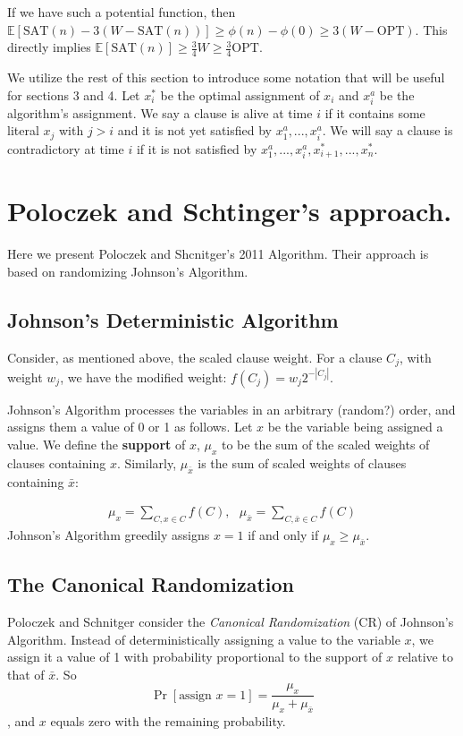 \documentclass[11pt,letter]{article}
\begin{document}
If we have such a potential function, then $\mathbb{E}[\text{SAT}(n)- 3\left(W-\text{SAT}(n)\right)] \geq \phi(n) - \phi(0) \geq 3(W-\text{OPT})$.
This directly implies $\mathbb{E}[\text{SAT}(n)] \geq \frac{3}{4} W \geq \frac{3}{4} \text{OPT}$. 

We utilize the rest of this section to introduce some notation that will be useful for sections 3 and 4. 
Let $x_i^*$ be the optimal assignment of $x_i$ and $x_i^{a}$ be the algorithm's assignment. We say a clause is alive 
at time $i$ if it contains some literal $x_j$ with $j > i$ and it is not yet satisfied by $x_1^a,...,x_i^a$. 
We will say a clause is contradictory at time $i$ if it is not satisfied by $x_1^a,...,x_i^a,x_{i+1}^*,...,x_n^*$. 

\section{Poloczek and Schtinger's approach.}

Here we present Poloczek and Shcnitger's 2011 Algorithm. Their approach is based on randomizing Johnson's Algorithm.

\subsection{Johnson's Deterministic Algorithm}

Consider, as mentioned above, the scaled clause weight. For a clause $C_j$, with weight $w_j$, we have the modified weight:  $f(C_j) = w_j 2^{-|C_j|}$. 

Johnson's Algorithm processes the variables in an arbitrary (random?) order, and assigns them a value of 0 or 1 as follows. Let $x$ be the variable being assigned a value. We define the \textbf{support} of $x$, $\mu_x$ to be the sum of the scaled weights of clauses containing $x$. Similarly, $\mu_{\bar{x}}$ is the sum of scaled weights of clauses containing $\bar{x}$:

\begin{align*}
\mu_x = \sum_{C,x\in C}f(C), \,\,\,\, \mu_{\bar{x}} =\sum_{C,\bar{x}\in C}f(C)
\end{align*}
Johnson's Algorithm greedily assigns $x=1$ if and only if $\mu_x \ge \mu_{\bar{x}}$.

\subsection{The Canonical Randomization}
Poloczek and Schnitger consider the \textit{Canonical Randomization} (CR) of Johnson's Algorithm. Instead of deterministically assigning a value to the variable $x$, we assign it a value of 1 with probability proportional to the support of $x$ relative to that of $\bar{x}$. So
$$ \Pr[\text{assign } x=1] = \frac{\mu_x}{\mu_x + \mu_{\bar{x}}}$$, and $x$ equals zero with the remaining probability.
\end{document}
